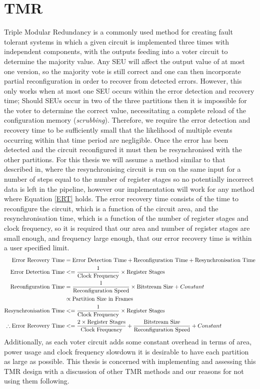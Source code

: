 \documentclass[12pt,final,oneside]{memoir} %
\begin{document}
\section{\acl{TMR}}
Triple Modular Redundancy is a commonly used method for creating fault tolerant systems in which a given circuit is implemented three times with independent components, with the outputs feeding into a voter circuit to determine the majority value. Any \ac{SEU} will affect the output value of at most one version, so the majority vote is still correct and one can then incorporate partial reconfiguration in order to recover from detected errors. However, this only works when at most one \ac{SEU} occurs within the error detection and recovery time; Should \acp{SEU} occur in two of the three partitions then it is impossible for the voter to determine the correct value, necessitating a complete reload of the configuration memory (\emph{scrubbing}). Therefore, we require the error detection and recovery time to be sufficiently small that the likelihood of multiple events occurring within that time period are negligible.
Once the error has been detected and the circuit reconfigured it must then be resynchronised with the other partitions. For this thesis we will assume a method similar to that described in\cite{DiesselChange}, where the resynchronising circuit is run on the same input for a number of steps equal to the number of register stages so no potentially incorrect data is left in the pipeline, however our implementation will work for any method where Equation \ref{ERT} holds.
The error recovery time consists of the time to reconfigure the circuit, which is a function of the circuit area, and the resynchronisation time, which is a function of the number of register stages and clock frequency, so it is required that our area and number of register stages are small enough, and frequency large enough, that our error recovery time is within a user specified limit.
\begin{align}
    \mbox{Error Recovery Time} &=\mbox{Error Detection Time} + \mbox{Reconfiguration Time} + \mbox{Resynchronisation Time}\notag\\
    \mbox{Error Detection Time} &<= \frac{1}{\mbox{Clock Frequency}}\times\mbox{Register Stages}\notag\\
    \mbox{Reconfiguration Time} &= \frac{1}{\mbox{Reconfiguration Speed}}\times\mbox{Bitstream Size}+Constant\notag\\
     &\propto \mbox{Partition Size in Frames}\notag\\
    \mbox{Resynchronisation Time} &<= \frac{1}{\mbox{Clock Frequency}}\times\mbox{Register Stages}\notag\\
    \therefore \mbox{Error Recovery Time} &<= \frac{2\times\mbox{Register Stages}}{\mbox{Clock Frequency}} + \frac{\mbox{Bitstream Size}}{\mbox{Reconfiguration Speed}}+Constant\label{ERT}
\end{align}\cite{DiesselChange}
Additionally, as each voter circuit adds some constant overhead in terms of area, power usage and clock frequency slowdown it is desirable to have each partition as large as possible. This thesis is concerned with implementing and assessing this \ac{TMR} design with a discussion of other \ac{TMR} methods and our reasons for not using them following.
\end{document}
